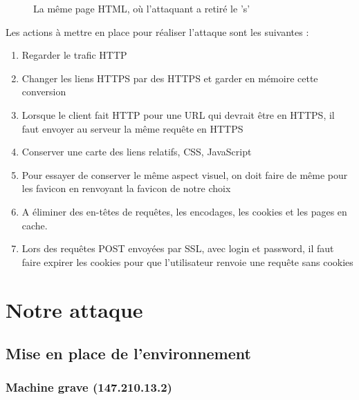 \begin{figure}[H]
  \caption{La même page HTML, où l'attaquant a retiré le 's'}
\end{figure}

Les actions à mettre en place pour réaliser l'attaque sont les suivantes :

\begin{enumerate}
\item Regarder le trafic HTTP
\item Changer les liens HTTPS par des HTTPS et garder en mémoire cette conversion
\item Lorsque le client fait HTTP pour une URL qui devrait être en HTTPS, il faut envoyer au serveur la même requête en HTTPS
\item Conserver une carte des liens relatifs, CSS, JavaScript
\item Pour essayer de conserver le même aspect visuel, on doit faire de même pour les favicon en renvoyant la favicon de notre choix
\item A éliminer des en-têtes de requêtes, les encodages, les cookies et les pages en cache.
\item Lors des requêtes POST envoyées par SSL, avec login et password, il faut faire expirer les cookies pour que l'utilisateur renvoie une requête sans cookies
\end{enumerate}

\section{Notre attaque}

\subsection{Mise en place de l'environnement}

\subsubsection{Machine grave (147.210.13.2)}

